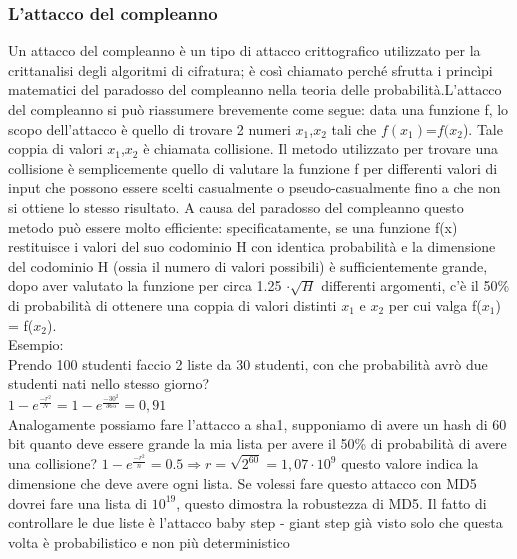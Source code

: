 \documentclass[10pt,a4paper]{article}
\begin{document}
\subsubsection{L'attacco del compleanno}
Un attacco del compleanno è un tipo di attacco crittografico utilizzato per la crittanalisi degli algoritmi di cifratura; è così chiamato perché sfrutta i princìpi matematici del paradosso del compleanno nella teoria delle probabilità.L'attacco del compleanno si può riassumere brevemente come segue: data una funzione f, lo scopo dell'attacco è quello di trovare 2 numeri $x_1$,$x_2$ tali che $f(x_1)$=$f(x_2$). Tale coppia di valori $x_1$,$x_2$ è chiamata collisione. Il metodo utilizzato per trovare una collisione è semplicemente quello di valutare la funzione f per differenti valori di input che possono essere scelti casualmente o pseudo-casualmente fino a che non si ottiene lo stesso risultato. A causa del paradosso del compleanno questo metodo può essere molto efficiente: specificatamente, se una funzione f(x) restituisce i valori del suo codominio H con identica probabilità e la dimensione del codominio H (ossia il numero di valori possibili) è sufficientemente grande, dopo aver valutato la funzione per circa 1.25 $\cdot \sqrt H$ differenti argomenti, c'è il 50\% di probabilità di ottenere una coppia di valori distinti $x_1$ e $x_2$ per cui valga f($x_1$) = f($x_2$).\\
Esempio:\\
Prendo 100 studenti faccio 2 liste da 30 studenti, con che probabilità avrò due studenti nati nello stesso giorno?\\
$1-e^{\frac{-r^2}{N}}= 1-e^{\frac{-30^2}{365}}= 0,91$\\
Analogamente possiamo fare l'attacco a sha1, supponiamo di avere un hash di 60 bit quanto deve essere grande la mia lista per avere il 50\% di probabilità di avere una collisione?
$1-e^{\frac{-r^2}{n}}=0.5 \Rightarrow r=\sqrt{2^{60}} = 1,07\cdot 10^9 $ questo valore indica la dimensione che deve avere ogni lista. Se volessi fare questo attacco con MD5 dovrei fare una lista di $10^19$, questo dimostra la robustezza di MD5. Il fatto di controllare le due liste è l'attacco baby step - giant step già visto solo che questa volta è probabilistico e non più deterministico
\end{document}
